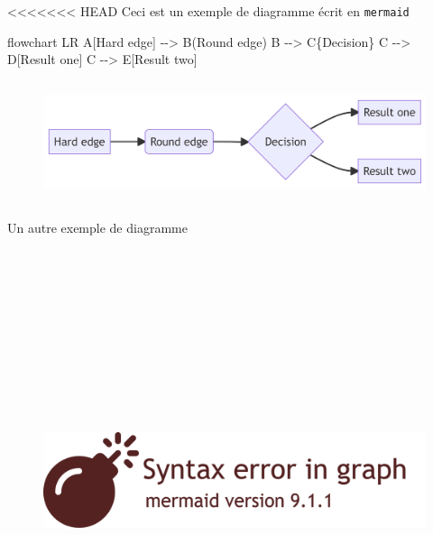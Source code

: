 \documentclass[
  a4paper,
]{scrbook}
\newenvironment{Shaded}{}{}
\newcommand{\NormalTok}[1]{\textcolor[rgb]{0.14,0.16,0.18}{#1}}
\begin{document}
<<<<<<< HEAD
Ceci est un exemple de diagramme écrit en \texttt{mermaid}

\begin{Shaded}
\begin{Highlighting}[numbers=left,,]

\NormalTok{flowchart LR}
\NormalTok{  A[Hard edge] {-}{-}\textgreater{} B(Round edge)}
\NormalTok{  B {-}{-}\textgreater{} C\{Decision\}}
\NormalTok{  C {-}{-}\textgreater{} D[Result one]}
\NormalTok{  C {-}{-}\textgreater{} E[Result two]}
\end{Highlighting}
\end{Shaded}

\begin{figure}[H]

{\centering \includegraphics[width=5.74in,height=1.4in]{./resultats_files/figure-latex/mermaid-figure-1.png}

}

\end{figure}

Un autre exemple de diagramme

\begin{figure}[H]

{\centering \includegraphics[width=5.33in,height=5.33in]{./resultats_files/figure-latex/mermaid-figure-2.png}

}

\end{figure}
\end{document}

